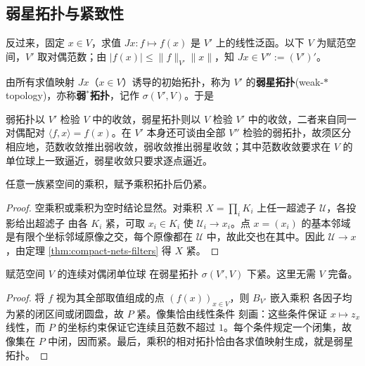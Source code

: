 \subsection{弱星拓扑与紧致性}

反过来，固定 $x\in V$，求值 $Jx:f\mapsto f(x)$ 是 $V'$ 上的线性泛函。以下 $V$ 为赋范空间，$V'$ 取对偶范数；由 $|f(x)|\leqslant\|f\|_{V'}\|x\|$，知 $Jx\in V'':=(V')'$。

\begin{definition}
    由所有求值映射 $Jx$（$x\in V$）诱导的初始拓扑，称为 $V'$ 的\textbf{弱星拓扑}(weak-$*$ topology)，亦称\textbf{弱$^*$拓扑}，记作 $\sigma(V',V)$。于是
\end{definition}

弱拓扑以 $V'$ 检验 $V$ 中的收敛，弱星拓扑则以 $V$ 检验 $V'$ 中的收敛，二者来自同一对偶配对 $\langle f,x\rangle=f(x)$。在 $V'$ 本身还可谈由全部 $V''$ 检验的弱拓扑，故须区分
相应地，范数收敛推出弱收敛，弱收敛推出弱星收敛；其中范数收敛要求在 $V$ 的单位球上一致逼近，弱星收敛只要求逐点逼近。

\begin{theorem}[Tychonoff]\label{thm:tychonoff-product}
    任意一族紧空间的乘积，赋予乘积拓扑后仍紧。
\end{theorem}
\begin{proof}
    空乘积或乘积为空时结论显然。对乘积 $X=\prod_i K_i$ 上任一超滤子 $\mathcal U$，各投影给出超滤子
    由各 $K_i$ 紧，可取 $x_i\in K_i$ 使 $\mathcal U_i\to x_i$。点 $x=(x_i)$ 的基本邻域是有限个坐标邻域原像之交，每个原像都在 $\mathcal U$ 中，故此交也在其中。因此 $\mathcal U\to x$，由定理 \ref{thm:compact-nets-filters} 得 $X$ 紧。
\end{proof}

\begin{theorem}\label{thm:banach-alaoglu}
    赋范空间 $V$ 的连续对偶闭单位球
    在弱星拓扑 $\sigma(V',V)$ 下紧。这里无需 $V$ 完备。
\end{theorem}
\begin{proof}
    将 $f$ 视为其全部取值组成的点 $(f(x))_{x\in V}$，则 $B_{V'}$ 嵌入乘积
    各因子均为紧的闭区间或闭圆盘，故 $P$ 紧。像集恰由线性条件
    刻画：这些条件保证 $x\mapsto z_x$ 线性，而 $P$ 的坐标约束保证它连续且范数不超过 $1$。每个条件规定一个闭集，故像集在 $P$ 中闭，因而紧。最后，乘积的相对拓扑恰由各求值映射生成，就是弱星拓扑。
\end{proof}

